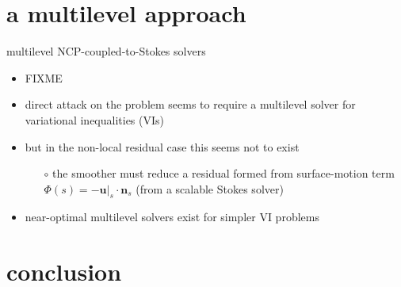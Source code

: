 \documentclass[svgnames,
               hyperref={colorlinks,citecolor=DeepPink4,linkcolor=FireBrick,urlcolor=Maroon},
               usepdftitle=false]  %
               {beamer}
\newcommand{\bn}{\mathbf{n}}
\newcommand{\bu}{\mathbf{u}}
\begin{document}
\section{a multilevel approach}

\begin{frame}{multilevel NCP-coupled-to-Stokes solvers}

\begin{itemize}
\item FIXME
\item direct attack on the problem seems to require a \alert{multilevel} solver for \alert{variational inequalities} (VIs)
\item but in the non-local residual case this seems not to exist
    \begin{itemize}
    \item[$\circ$] the \alert{smoother} must reduce a residual formed from surface-motion term $\Phi(s) = - \bu|_s\cdot \bn_s$ (from a scalable Stokes solver)
    \end{itemize}
\item near-optimal multilevel solvers exist for simpler VI problems
\end{itemize}
\end{frame}


\section{conclusion}
\end{document}
